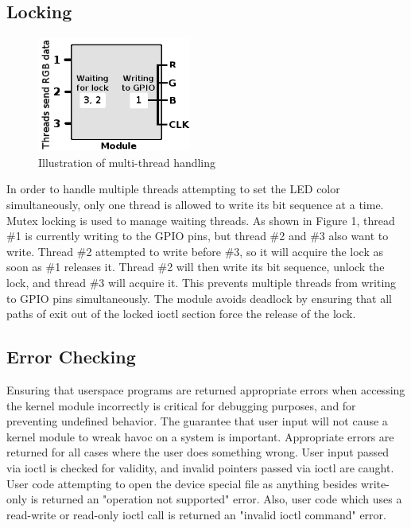 \documentclass[10pt]{article}
\begin{document}
\subsection{Locking}
\noindent
\begin{figure}
    \includegraphics[width=0.45\textwidth]{figure1}
  \caption{Illustration of multi-thread handling}
\end{figure}
\noindent In order to handle multiple threads attempting to set the LED color simultaneously, only one thread is allowed to write its bit sequence at a time. Mutex locking is used to manage waiting threads. As shown in Figure 1, thread \#1 is currently writing to the GPIO pins, but thread \#2 and \#3 also want to write. Thread \#2 attempted to write before \#3, so it will acquire the lock as soon as \#1 releases it. Thread \#2 will then write its bit sequence, unlock the lock, and thread \#3 will acquire it. This prevents multiple threads from writing to GPIO pins simultaneously. The module avoids deadlock by ensuring that all paths of exit out of the locked ioctl section force the release of the lock.

\subsection{Error Checking}
\noindent Ensuring that userspace programs are returned appropriate errors when accessing the kernel module incorrectly is critical for debugging purposes, and for preventing undefined behavior. The guarantee that user input will not cause a kernel module to wreak havoc on a system is important.
\newline
\noindent Appropriate errors are returned for all cases where the user does something wrong. User input passed via ioctl is checked for validity, and invalid pointers passed via ioctl are caught. User code attempting to open the device special file as anything besides write-only is returned an "operation not supported" error. Also, user code which uses a read-write or read-only ioctl call is returned an "invalid ioctl command" error.
\end{document}
